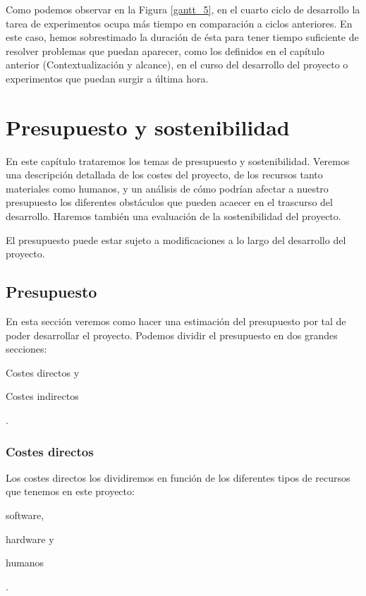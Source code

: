 \documentclass[titlepage,12pt]{report}
\begin{document}
Como podemos observar en la Figura \ref{gantt_5}, en el cuarto ciclo de desarrollo la tarea de experimentos ocupa más tiempo en comparación a ciclos anteriores. En este caso, hemos sobrestimado la duración de ésta para tener tiempo suficiente de resolver problemas que puedan aparecer, como los definidos en el capítulo anterior (Contextualización y alcance), en el curso del desarrollo del proyecto o experimentos que puedan surgir a última hora.

\chapter{Presupuesto y sostenibilidad}

En este capítulo trataremos los temas de presupuesto y sostenibilidad. Veremos una descripción detallada de los costes del proyecto, de los recursos tanto materiales como humanos, y un análisis de cómo podrían afectar a nuestro presupuesto los diferentes obstáculos que pueden acaecer en el trascurso del desarrollo. Haremos también una evaluación de la sostenibilidad del proyecto.

El presupuesto puede estar sujeto a modificaciones a lo largo del desarrollo del proyecto.

\section{Presupuesto}

En esta sección veremos como hacer una estimación del presupuesto por tal de poder desarrollar el proyecto. Podemos dividir el presupuesto en dos grandes secciones: \begin{enumerate*}[label=\roman*)] \item Costes directos y \item Costes indirectos
\end{enumerate*}.

\subsection{Costes directos}

Los costes directos los dividiremos en función de los diferentes tipos de recursos que tenemos en este proyecto: \begin{enumerate*}[label=\roman*)] \item software, \item hardware y \item humanos \end{enumerate*}.
\end{document}
